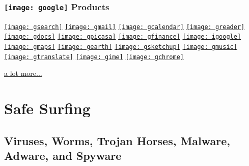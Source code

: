 \documentclass[hyperref={xetex,colorlinks,linkcolor=blue},green,compress]{beamer}
\newcommand\googlelogo{\texttt{[image: google]}}
\begin{document}
\begin{frame}\frametitle{\googlelogo{} Products}

\begin{center}
  \href{http://www.google.com}{\texttt{[image: gsearch]}}
  \href{http://gmail.com}{\texttt{[image: gmail]}}
  \href{http://www.google.com/calendar/}{\texttt{[image: gcalendar]}}
  \href{http://reader.google.com}{\texttt{[image: greader]}}
  \href{http://docs.google.com/}{\texttt{[image: gdocs]}}
  \href{http://picasaweb.google.com}{\texttt{[image: gpicasa]}}
  \href{http://www.google.com/finance}{\texttt{[image: gfinance]}}
  \href{http://www.google.cn/ig}{\texttt{[image: igoogle]}}
  \href{http://maps.google.com}{\texttt{[image: gmaps]}}
  \href{http://earth.google.com}{\texttt{[image: gearth]}}
  \href{http://sketchup.google.com}{\texttt{[image: gsketchup]}}
  \href{http://www.google.cn/music}{\texttt{[image: gmusic]}}
  \href{http://translate.google.cn}{\texttt{[image: gtranslate]}}
  \href{http://tools.google.com/pinyin}{\texttt{[image: gime]}}
  \href{http://www.google.com/chrome}{\texttt{[image: gchrome]}}
\end{center}

\begin{center}
  \href{http://www.google.cn/intl/zh-CN/options/}{a lot more...}
\end{center}

\end{frame}

\section{Safe Surfing}
\label{sec:safe}


\subsection[Dangerous]{Viruses, Worms, Trojan Horses, Malware, Adware, and Spyware}
\label{sec:virus}
\end{document}
